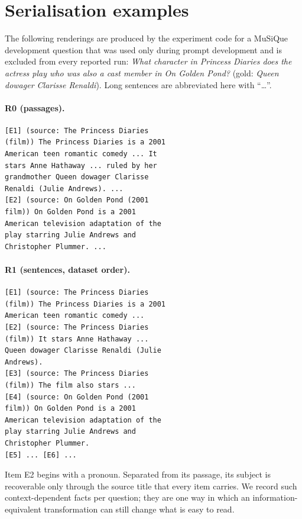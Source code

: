 \section{Serialisation examples}
\label{app:serialisation}

The following renderings are produced by the experiment code for a MuSiQue development question that was used only during prompt development and is excluded from every reported run: \emph{What character in Princess Diaries does the actress play who was also a cast member in On Golden Pond?} (gold: \emph{Queen dowager Clarisse Renaldi}). Long sentences are abbreviated here with ``\dots''.

\paragraph{R0 (passages).}
\begin{footnotesize}
\begin{verbatim}
[E1] (source: The Princess Diaries
(film)) The Princess Diaries is a 2001
American teen romantic comedy ... It
stars Anne Hathaway ... ruled by her
grandmother Queen dowager Clarisse
Renaldi (Julie Andrews). ...
[E2] (source: On Golden Pond (2001
film)) On Golden Pond is a 2001
American television adaptation of the
play starring Julie Andrews and
Christopher Plummer. ...
\end{verbatim}
\end{footnotesize}

\paragraph{R1 (sentences, dataset order).}
\begin{footnotesize}
\begin{verbatim}
[E1] (source: The Princess Diaries
(film)) The Princess Diaries is a 2001
American teen romantic comedy ...
[E2] (source: The Princess Diaries
(film)) It stars Anne Hathaway ...
Queen dowager Clarisse Renaldi (Julie
Andrews).
[E3] (source: The Princess Diaries
(film)) The film also stars ...
[E4] (source: On Golden Pond (2001
film)) On Golden Pond is a 2001
American television adaptation of the
play starring Julie Andrews and
Christopher Plummer.
[E5] ... [E6] ...
\end{verbatim}
\end{footnotesize}

\noindent Item E2 begins with a pronoun. Separated from its passage, its subject is recoverable only through the source title that every item carries. We record such context-dependent facts per question; they are one way in which an information-equivalent transformation can still change what is easy to read.


